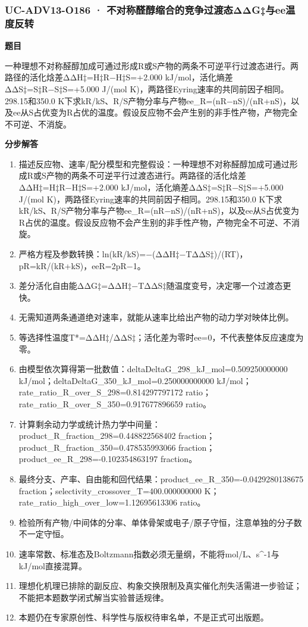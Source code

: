 \documentclass[UTF8,11pt,a4paper]{ctexart}
\begin{document}
\subsubsection*{UC-ADV13-O186 · 不对称醛醇缩合的竞争过渡态ΔΔG‡与ee温度反转}
\noindent\textbf{题目}\par
一种理想不对称醛醇加成可通过形成R或S产物的两条不可逆平行过渡态进行。两路径的活化焓差ΔΔH‡=H‡R−H‡S=+2.000 kJ/mol，活化熵差ΔΔS‡=S‡R−S‡S=+5.000 J/(mol K)，两路径Eyring速率的共同前因子相同。298.15和350.0 K下求kR/kS、R/S产物分率与产物ee\_R=(nR−nS)/(nR+nS)，以及ee从S占优变为R占优的温度。假设反应物不会产生别的非手性产物，产物完全不可逆、不消旋。\par
\medskip\noindent\textbf{分步解答}
\begin{enumerate}
\item 描述反应物、速率/配分模型和完整假设：一种理想不对称醛醇加成可通过形成R或S产物的两条不可逆平行过渡态进行。两路径的活化焓差ΔΔH‡=H‡R−H‡S=+2.000 kJ/mol，活化熵差ΔΔS‡=S‡R−S‡S=+5.000 J/(mol K)，两路径Eyring速率的共同前因子相同。298.15和350.0 K下求kR/kS、R/S产物分率与产物ee\_R=(nR−nS)/(nR+nS)，以及ee从S占优变为R占优的温度。假设反应物不会产生别的非手性产物，产物完全不可逆、不消旋。
\item 严格方程及参数转换：ln(kR/kS)=−(ΔΔH‡−TΔΔS‡)/(RT)，pR=kR/(kR+kS)，eeR=2pR−1。
\item 差分活化自由能ΔΔG‡=ΔΔH‡−TΔΔS‡随温度变号，决定哪一个过渡态更快。
\item 无需知道两条通道绝对速率，就能从速率比给出产物的动力学对映体比例。
\item 等选择性温度T*=ΔΔH‡/ΔΔS‡；活化差为零时ee=0，不代表整体反应速度为零。
\item 由模型依次算得第一批数值：deltaDeltaG\_298\_kJ\_mol=0.509250000000 kJ/mol；deltaDeltaG\_350\_kJ\_mol=0.250000000000 kJ/mol；rate\_ratio\_R\_over\_S\_298=0.814297797172 ratio；rate\_ratio\_R\_over\_S\_350=0.917677896659 ratio。
\item 计算剩余动力学或统计热力学中间量：product\_R\_fraction\_298=0.448822568402 fraction；product\_R\_fraction\_350=0.478535993066 fraction；product\_ee\_R\_298=-0.102354863197 fraction。
\item 最终分支、产率、自由能和回代结果：product\_ee\_R\_350=-0.0429280138675 fraction；selectivity\_crossover\_T=400.000000000 K；rate\_ratio\_high\_over\_low=1.12695613306 ratio。
\item 检验所有产物/中间体的分率、单体骨架或电子/原子守恒，注意单独的分子数不一定守恒。
\item 速率常数、标准态及Boltzmann指数必须无量纲，不能将mol/L、s\textasciicircum{}-1与kJ/mol直接混算。
\item 理想化机理已排除的副反应、构象交换限制及真实催化剂失活需进一步验证；不能把本题数学闭式解当实验普适规律。
\item 本题仍在专家原创性、科学性与版权待审名单，不是正式可出版题。
\end{enumerate}
\end{document}

